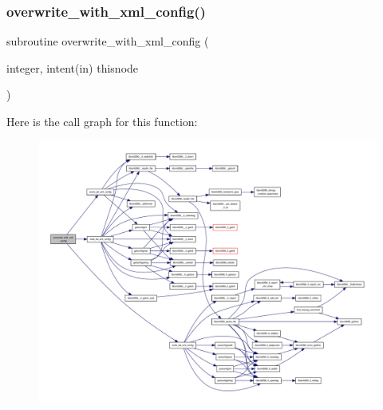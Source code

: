 \subsubsection{\texorpdfstring{overwrite\+\_\+with\+\_\+xml\+\_\+config()}{overwrite\_with\_xml\_config()}}
{\footnotesize\ttfamily subroutine overwrite\+\_\+with\+\_\+xml\+\_\+config (\begin{DoxyParamCaption}\item[{integer, intent(in)}]{thisnode }\end{DoxyParamCaption})}

Here is the call graph for this function\+:
\nopagebreak
\begin{figure}[H]
\begin{center}
\leavevmode
\includegraphics[width=350pt]{ed__params_8f90_a2c0c887700d85a5be6fbd26b071c8da6_cgraph}
\end{center}
\end{figure}
